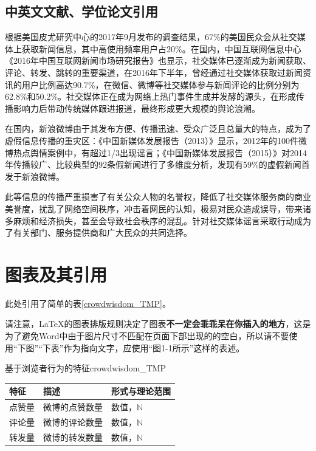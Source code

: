 \documentclass[a4paper,AutoFakeBold,oneside,12pt]{book}
\begin{document}
\subsection{中英文文献、学位论文引用}
根据美国皮尤研究中心的2017年9月发布的调查结果\cite{pew_news_use_2017}，67\%的美国民众会从社交媒体上获取新闻信息，其中高使用频率用户占20\%。在国内，中国互联网信息中心《2016年中国互联网新闻市场研究报告》\cite{internet_news_2016}也显示，社交媒体已逐渐成为新闻获取、评论、转发、跳转的重要渠道，在2016年下半年，曾经通过社交媒体获取过新闻资讯的用户比例高达90.7\%，在微信、微博等社交媒体参与新闻评论的比例分别为62.8\%和50.2\%。社交媒体正在成为网络上热门事件生成并发酵的源头，在形成传播影响力后带动传统媒体跟进报道，最终形成更大规模的舆论浪潮。\cite{Yang2012Automatic}

在国内，新浪微博由于其发布方便、传播迅速、受众广泛且总量大的特点，成为了虚假信息传播的重灾区：《中国新媒体发展报告（2013）》\cite{唐绪军2013中国新媒体发展报告}显示，2012年的100件微博热点舆情案例中，有超过1/3出现谣言；《中国新媒体发展报告（2015）》\cite{唐绪军2015中国新媒体发展报告}对2014年传播较广、比较典型的92条假新闻进行了多维度分析，发现有59\%的虚假新闻首发于新浪微博。

此等信息的传播严重损害了有关公众人物的名誉权，降低了社交媒体服务商的商业美誉度，扰乱了网络空间秩序，冲击着网民的认知，极易对民众造成误导，带来诸多麻烦和经济损失，甚至会导致社会秩序的混乱。针对社交媒体谣言采取行动成为了有关部门、服务提供商和广大民众的共同选择。\cite{周兴2017基于深度学习的谣言检测及模式挖掘}

\section{图表及其引用}
此处引用了简单的表\ref{crowdwisdom_TMP}。

请注意，\LaTeX{}的图表排版规则决定了图表\textbf{不一定会乖乖呆在你插入的地方}，这是为了避免Word中由于图片尺寸不匹配在页面下部出现的的空白，所以请不要使用“下图”“下表”作为指向文字，应使用“图1-1所示”这样的表述。

\begin{bupttable}{基于浏览者行为的特征}{crowdwisdom_TMP}

    \begin{tabular}{l|l|l}
		\hline \textbf{特征} & \textbf{描述} & \textbf{形式与理论范围}\\
		\hline 点赞量 & 微博的点赞数量 & 数值，$\mathbb{N}$ \\
		\hline 评论量 & 微博的评论数量 & 数值，$\mathbb{N}$ \\
		\hline 转发量 & 微博的转发数量 & 数值，$\mathbb{N}$ \\
		\hline
    \end{tabular}
\end{bupttable}
\end{document}
